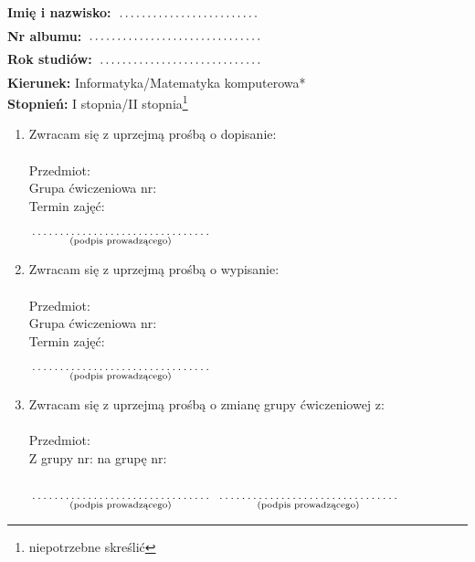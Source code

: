 \documentclass[a4paper,11pt]{article}
\newcommand{\fillField}[2]{
    $\underset{\text{#1}}{\parbox[t]{#2}{\dotfill}}$
}
\begin{document}
\noindent
\textbf{Imię i nazwisko:}   \fillField{}{4cm}\\
\textbf{Nr albumu:}   \fillField{}{4.9cm}\\
\textbf{Rok studiów:} \fillField{}{4.6cm}\\
\textbf{Kierunek:} Informatyka/Matematyka komputerowa*\\
\textbf{Stopnień:} I stopnia/II stopnia\footnote[1]{niepotrzebne skreślić}

\vskip 2.0cm

\begin{enumerate}
    \item Zwracam się z uprzejmą prośbą o dopisanie: \\\\
    Przedmiot: \dotfill\\
    Grupa ćwiczeniowa nr: \dotfill\\
    Termin zajęć: \dotfill\\\\

    \hspace{\fill} \fillField{(podpis prowadzącego)}{5cm} \hspace{2.0cm}

    \vskip 1.0cm

    \item Zwracam się z uprzejmą prośbą o wypisanie: \\\\
    Przedmiot: \dotfill\\
    Grupa ćwiczeniowa nr: \dotfill\\
    Termin zajęć: \dotfill\\\\

    \hspace{\fill} \fillField{(podpis prowadzącego)}{5cm} \hspace{2.0cm}

    \vskip 1.0cm

    \item Zwracam się z uprzejmą prośbą o zmianę grupy ćwiczeniowej z: \\\\
    Przedmiot: \dotfill\\
    Z grupy nr: \dotfill na grupę nr: \dotfill\\\\

    \fillField{(podpis prowadzącego)}{5cm} \hspace{5.0cm} \fillField{(podpis prowadzącego)}{5cm}

\end{enumerate}
\end{document}
